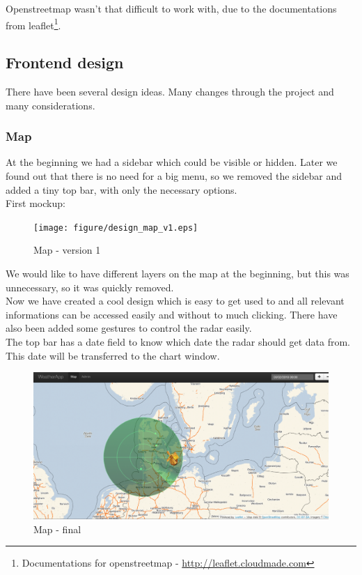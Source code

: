 
Openstreetmap wasn't that difficult to work with, due to the documentations from leaflet\footnote{Documentations for openstreetmap - \url{http://leaflet.cloudmade.com}}.

\subsection{Frontend design}
There have been several design ideas. Many changes through the project and many considerations.
\subsubsection{Map}
At the beginning we had a sidebar which could be visible or hidden. Later we found out that there is no need for a big menu, so we removed the sidebar and added a tiny top bar, with only the necessary options.\\
First mockup:
\begin{figure}[htbp]
   \centering
   \texttt{[image: figure/design\_map\_v1.eps]}
   \caption{Map - version 1}
\end{figure}

We would like to have different layers on the map at the beginning, but this was unnecessary, so it was quickly removed.\\
Now we have created a cool design which is easy to get used to and all relevant informations can be accessed easily and without to much clicking.
There have also been added some gestures to control the radar easily.\\
The top bar has a date field to know which date the radar should get data from. This date will be transferred to the chart window.

\begin{figure}[htbp]
   \centering
   \includegraphics[width=1\linewidth]{figure/design_map_final.eps}
   \caption{Map - final}
\end{figure}

